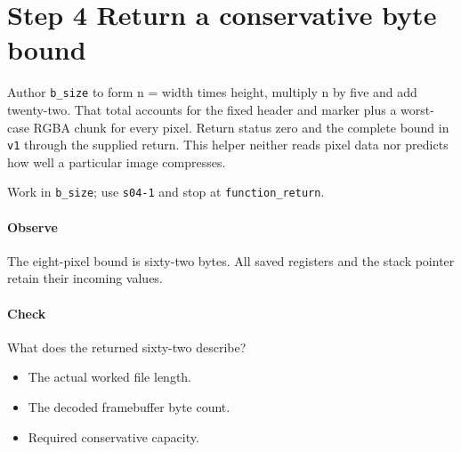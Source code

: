 \section{Step 4 Return a conservative byte bound}\label{qoi-s04}
Author \texttt{b\_size} to form n = width times height, multiply n by five and add twenty-two. That total accounts for the fixed header and marker plus a worst-case RGBA chunk for every pixel. Return status zero and the complete bound in \texttt{v1} through the supplied return. This helper neither reads pixel data nor predicts how well a particular image compresses.

Work in \texttt{b\_size}; use \texttt{s04-1} and stop at \texttt{function\_return}.

\paragraph{Observe} The eight-pixel bound is sixty-two bytes. All saved registers and the stack pointer retain their incoming values.

\paragraph{Check} What does the returned sixty-two describe?
\begin{itemize}
  \item[A.] The actual worked file length.
  \item[B.] The decoded framebuffer byte count.
  \item[C.] Required conservative capacity.
\end{itemize}
